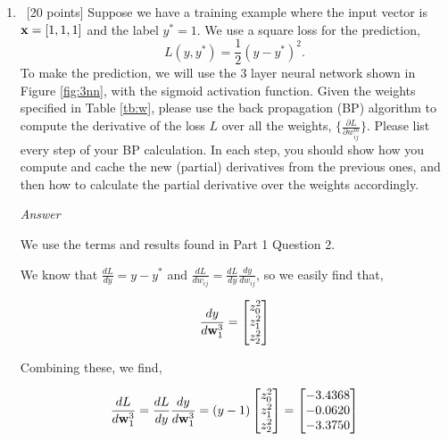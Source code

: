 \documentclass[12pt, fullpage,letterpaper]{article}
\begin{document}
\begin{enumerate}
\begin{lstlisting}[language=Python, caption=Functions used to generate results for Part 1 Questions 2 and 3]
    print('\nLAYER 2')
    dy_dz21 = w31[1]
    dz21_dw21 = z1
    dL_dw21 = dL_dy * dy_dz21 * dz21_dw21
    print('dL_dw21', dL_dw21)

    dy_dz22 = w31[2]
    dz22_dw22 = z1
    dL_dw22 = dL_dy * dy_dz22 * dz22_dw22
    print('dL_dw22', dL_dw22)

    print('\nLAYER 1')
    dz21_dz11 = w21[1]
    dz22_dz11 = w22[1]
    dz11_dw11 = x
    dL_dw11 = dL_dy * (
        dy_dz21 * dz21_dz11 + dy_dz22 * dz22_dz11
    ) * dz11_dw11
    print('dL_dw11', dL_dw11)

    dz21_dz12 = w21[2]
    dz22_dz12 = w22[2]
    dz12_dw12 = x
    dL_dw11 = dL_dy * (
        dy_dz21 * dz21_dz12 + dy_dz22 * dz22_dz12
    ) * dz12_dw12
    print('dL_dw12', dL_dw11)


def sigmoid(x):
    return 1 / (1 + math.exp(-x))
	\end{lstlisting}
	
	\item~[20 points] Suppose we have a training example  where the input vector is ${\bf x} = [1,1,1]$ and the label $y^* = 1$. We use a square loss for the prediction, 
	\[
	L(y, y^*) = \frac{1}{2}(y-y^*)^2.
	\]
	To make the prediction, we will use the 3 layer neural network shown in Figure \ref{fig:3nn}, with the sigmoid activation function. Given the weights specified in Table \ref{tb:w}, please use the back propagation (BP) algorithm to compute the derivative of the loss $L$ over all the weights, $\{\frac{\partial L}{\partial w^{m}_{ij}}\}$. Please list every step of your BP calculation. In each step, you should show how you compute and cache the new (partial) derivatives from the previous ones, and then how to calculate the partial derivative over the weights accordingly.  
	
	\emph{Answer}
	
	We use the terms and results found in Part 1 Question 2.
	
	We know that $\frac{dL}{dy} = y - y^*$ and $\frac{dL}{dw_{ij}} = \frac{dL}{dy} \frac{dy}{dw_{ij}}$, so we easily find that,
	
	\[
	    \frac{dy}{d{\bf w}^3_1} = \begin{bmatrix}
	        z^2_0 \\
	        z^2_1 \\
	        z^2_2
	    \end{bmatrix}
	\]
	
	Combining these, we find,
	
	\[
	    \frac{dL}{d{\bf w}^3_1} = \frac{dL}{dy} \frac{dy}{d{\bf w}^3_1} = (y - 1) \begin{bmatrix}
	        z^2_0 \\
	        z^2_1 \\
	        z^2_2
	    \end{bmatrix} = \begin{bmatrix}
	        -3.4368 \\
	        -0.0620 \\
	        -3.3750
	    \end{bmatrix}
	\]
	

\end{enumerate}
\end{document}
